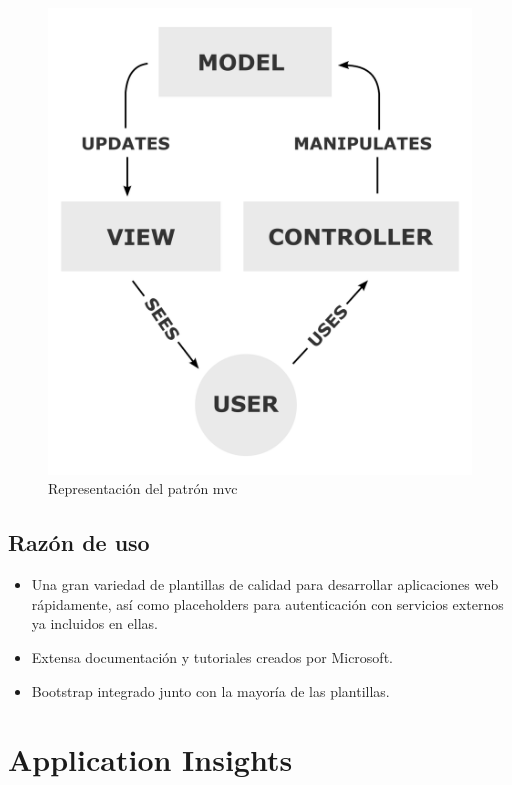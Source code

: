 \begin{figure}[!htbp]
	\centering
	\includegraphics[scale=0.50]{fig/mvc_pattern}
	\caption{Representación del patrón \acrshort{mvc}}
\end{figure}

\subsection{Razón de uso}

\begin{itemize}
	\item Una gran variedad de plantillas de calidad para desarrollar aplicaciones web rápidamente, así como placeholders para autenticación con servicios externos ya incluidos en ellas.
	\item Extensa documentación y tutoriales creados por Microsoft.
	\item Bootstrap integrado junto con la mayoría de las plantillas.

\end{itemize}

\section{Application Insights}

